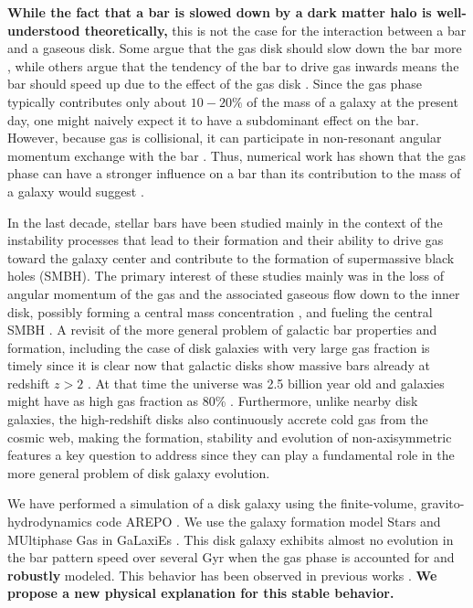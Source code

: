 \documentclass[twocolumn,linenumbers,trackchanges]{aastex631}
\newcommand{\AREPO}{\textsc{AREPO}}
\newcommand{\SMUGGLE}{SMUGGLE}
\begin{document}
{\bf While the fact that a bar is slowed down by a dark matter halo is
well-understood theoretically,} this is not the case for the interaction between
a bar and a gaseous disk. Some argue that the gas disk should slow down the bar
more \citep{2003MNRAS.341.1179A}, while others argue that the tendency of the
bar to drive gas inwards means the bar should speed up due to the effect of the
gas disk \citep{2013MNRAS.429.1949A, 2014MNRAS.438L..81A}. Since the gas phase
typically contributes only about $10-20\%$ of the mass of a galaxy at the
present day, one might naively expect it to have a subdominant effect on the
bar. However, because gas is collisional, it can participate in non-resonant
angular momentum exchange with the bar \citep{2011MNRAS.415.1027H}. Thus,
numerical work has shown that the gas phase can have a stronger influence on a
bar than its contribution to the mass of a galaxy would suggest
\citep[e.g.,][]{2010ApJ...719.1470V, 2013MNRAS.429.1949A}.


In the last decade, stellar bars have been studied mainly in the context of the
instability processes that lead to their formation and their ability to drive
gas toward the galaxy center and contribute to the formation of supermassive
black holes (SMBH). The primary interest of these studies mainly was in the loss
of angular momentum of the gas and the associated  gaseous flow down to the
inner disk, possibly forming a central mass concentration
\citep{2010ApJ...719.1470V}, and fueling the central SMBH
\citep[e.g.][]{1989Natur.338...45S, 1990Natur.345..679S}. A revisit of the more
general problem of galactic bar properties and formation, including the case of
disk galaxies with very large gas fraction is timely since it is clear now that
galactic disks show massive bars already at redshift $z>2$
\citep{2022arXiv221008658G}. At that time the universe was 2.5 billion year old
and galaxies might have as high gas fraction as 80\% \citep{2020ARAA..58..157T}.
Furthermore, unlike nearby disk galaxies, the high-redshift disks also
continuously accrete cold gas from the cosmic web, making the formation,
stability and evolution of non-axisymmetric features a key question to address
since they can play a fundamental role in the more general problem of disk
galaxy evolution.



We have performed a simulation of a disk galaxy using the finite-volume,
gravito-hydrodynamics code \AREPO{} \citep{2010MNRAS.401..791S}. We use the
galaxy formation model Stars and MUltiphase Gas in GaLaxiEs
\citep[\SMUGGLE{};][]{2019MNRAS.489.4233M}. This disk galaxy exhibits almost no
evolution in the bar pattern speed over several Gyr when the gas phase is
accounted for and {\bf robustly} modeled. This behavior has been observed in
previous works \citep{1993AA...268...65F, 2007ApJ...666..189B,
2009ApJ...707..218V, 2010ApJ...719.1470V, 2014MNRAS.438L..81A}. {\bf We propose a new
physical explanation for this stable behavior.}
\end{document}
